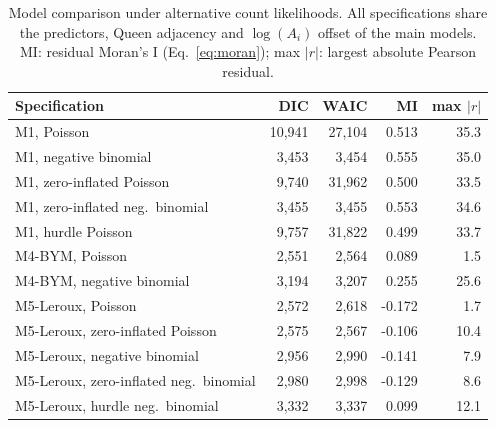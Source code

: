 \begin{table}[h]
\caption{Model comparison under alternative count likelihoods. All specifications share the predictors, Queen adjacency and $\log(A_i)$ offset of the main models. MI: residual Moran's I (Eq.~\ref{eq:moran}); max $|r|$: largest absolute Pearson residual.}\label{tabA5}
\footnotesize
\begin{tabular}{@{}lrrrr@{}}
\toprule
Specification & DIC & WAIC & MI & max $|r|$ \\
\midrule
M1, Poisson & 10,941 & 27,104 & 0.513 & 35.3 \\
M1, negative binomial & 3,453 & 3,454 & 0.555 & 35.0 \\
M1, zero-inflated Poisson & 9,740 & 31,962 & 0.500 & 33.5 \\
M1, zero-inflated neg.\ binomial & 3,455 & 3,455 & 0.553 & 34.6 \\
M1, hurdle Poisson & 9,757 & 31,822 & 0.499 & 33.7 \\
M4-BYM, Poisson & 2,551 & 2,564 & 0.089 & 1.5 \\
M4-BYM, negative binomial & 3,194 & 3,207 & 0.255 & 25.6 \\
M5-Leroux, Poisson & 2,572 & 2,618 & -0.172 & 1.7 \\
M5-Leroux, zero-inflated Poisson & 2,575 & 2,567 & -0.106 & 10.4 \\
M5-Leroux, negative binomial & 2,956 & 2,990 & -0.141 & 7.9 \\
M5-Leroux, zero-inflated neg.\ binomial & 2,980 & 2,998 & -0.129 & 8.6 \\
M5-Leroux, hurdle neg.\ binomial & 3,332 & 3,337 & 0.099 & 12.1 \\
\bottomrule
\end{tabular}
\end{table}
